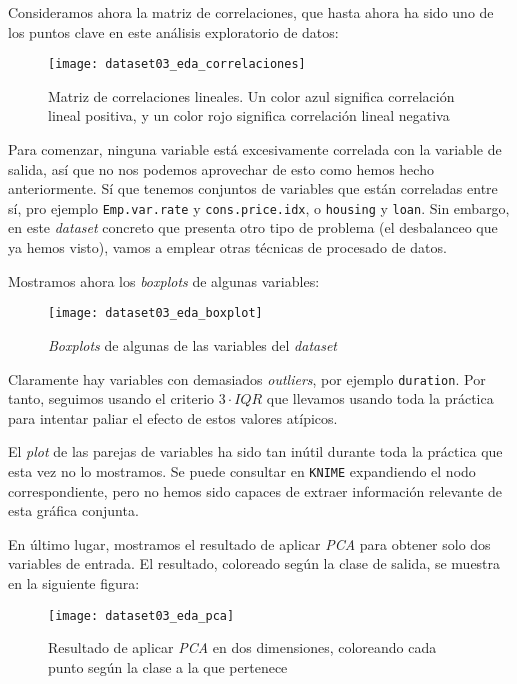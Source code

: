 \documentclass[11pt]{article}
\begin{document}
Consideramos ahora la matriz de correlaciones, que hasta ahora ha sido uno de los puntos clave en este análisis exploratorio de datos:

\begin{figure}[H]
    \centering
    \texttt{[image: dataset03\_eda\_correlaciones]}
    \caption{Matriz de correlaciones lineales. Un color azul significa correlación lineal positiva, y un color rojo significa correlación lineal negativa}
\end{figure}

Para comenzar, ninguna variable está excesivamente correlada con la variable de salida, así que no nos podemos aprovechar de esto como hemos hecho anteriormente. Sí que tenemos conjuntos de variables que están correladas entre sí, pro ejemplo \lstinline{Emp.var.rate} y \lstinline{cons.price.idx}, o \lstinline{housing} y \lstinline{loan}. Sin embargo, en este \emph{dataset} concreto que presenta otro tipo de problema (el desbalanceo que ya hemos visto), vamos a emplear otras técnicas de procesado de datos.

Mostramos ahora los \emph{boxplots} de algunas variables:

\begin{figure}[H]
    \centering
    \texttt{[image: dataset03\_eda\_boxplot]}
    \caption{\emph{Boxplots} de algunas de las variables del \emph{dataset}}
\end{figure}

Claramente hay variables con demasiados \emph{outliers}, por ejemplo \lstinline{duration}. Por tanto, seguimos usando el criterio $3 \cdot IQR$ que llevamos usando toda la práctica para intentar paliar el efecto de estos valores atípicos.

El \emph{plot} de las parejas de variables ha sido tan inútil durante toda la práctica que esta vez no lo mostramos. Se puede consultar en \lstinline{KNIME} expandiendo el nodo correspondiente, pero no hemos sido capaces de extraer información relevante de esta gráfica conjunta.

En último lugar, mostramos el resultado de aplicar \emph{PCA} para obtener solo dos variables de entrada. El resultado, coloreado según la clase de salida, se muestra en la siguiente figura:

\begin{figure}[H]
    \centering
    \texttt{[image: dataset03\_eda\_pca]}
    \caption{Resultado de aplicar \emph{PCA} en dos dimensiones, coloreando cada punto según la clase a la que pertenece}
\end{figure}
\end{document}

